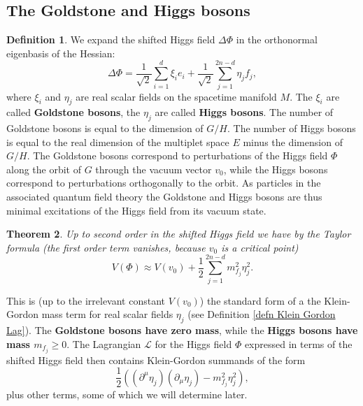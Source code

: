 \documentclass[12pt]{amsart}
\newtheorem{thm}{Theorem}[section]
\theoremstyle{definition}
\newtheorem{defn}[thm]{Definition}
\theoremstyle{remark}
\numberwithin{equation}{section}
\begin{document}
\subsection{The Goldstone and Higgs bosons}
\begin{defn}We expand the shifted Higgs field $\Delta\Phi$ in the orthonormal eigenbasis of the Hessian:
\begin{equation*}
\Delta\Phi=\frac{1}{\sqrt{2}}\sum_{i=1}^d\xi_ie_i+\frac{1}{\sqrt{2}}\sum_{j=1}^{2n-d}\eta_jf_j,
\end{equation*}
where $\xi_i$  and $\eta_j$ are real scalar fields on the spacetime manifold $M$. The $\xi_i$ are called {\bf Goldstone bosons}, the $\eta_j$ are called {\bf Higgs bosons}. The number of Goldstone bosons is equal to the dimension of $G/H$. The number of Higgs bosons is equal to the real dimension of the multiplet space $E$ minus the dimension of $G/H$. The Goldstone bosons correspond to perturbations of the Higgs field $\Phi$ along the orbit of $G$ through the vacuum vector $v_0$, while the Higgs bosons correspond to perturbations orthogonally to the orbit. As particles in the associated quantum field theory the Goldstone and Higgs bosons are thus minimal excitations of the Higgs field from its vacuum state.
\end{defn}
\begin{thm}\label{thm potential up to second order}
Up to second order in the shifted Higgs field we have by the Taylor formula (the first order term vanishes, because $v_0$ is a critical point)
\begin{equation*}
V(\Phi)\approx V(v_0)+\frac{1}{2}\sum_{j=1}^{2n-d} m_{f_j}^2\eta_j^2.
\end{equation*}
\end{thm}
This is (up to the irrelevant constant $V(v_0)$) the standard form of a the Klein-Gordon mass term for real scalar fields $\eta_j$ (see Definition \ref{defn Klein Gordon Lag}). The {\bf Goldstone bosons have zero mass}, while the {\bf Higgs bosons have mass $m_{f_j}\geq 0$}. The Lagrangian $\mathcal{L}$ for the Higgs field $\Phi$ expressed in terms of the shifted Higgs field then contains Klein-Gordon summands of the form 
\begin{equation*}
\frac{1}{2}\left((\partial^\mu\eta_j)(\partial_\mu\eta_j)-m_{f_j}^2\eta_j^2\right),
\end{equation*}
plus other terms, some of which we will determine later.
\end{document}
